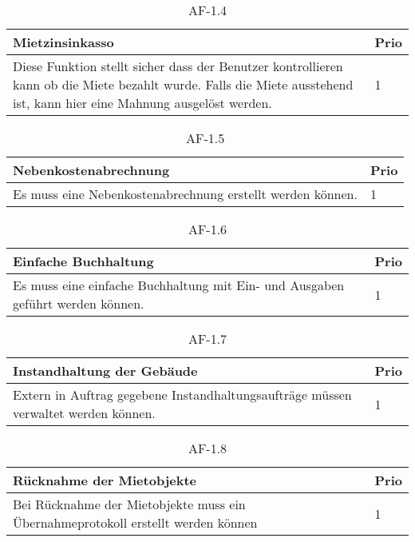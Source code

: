 \begin{table}[H]
  \centering
  \settowidth{}
  \setlength\extrarowheight{2pt}
  \begin{tabulary}{1.0\textwidth}{|m{16cm}|L|}
    \hline
    \textbf{Mietzinsinkasso}&\textbf{Prio}\\
    \hline
      Diese Funktion stellt sicher dass der Benutzer kontrollieren kann ob die Miete bezahlt wurde. Falls die Miete ausstehend ist, kann hier eine Mahnung ausgelöst werden. & 1\\
    \hline
  \end{tabulary}
  \caption{AF-1.4}
  \label{af14}
\end{table}

\begin{table}[H]
  \centering
  \settowidth{}
  \setlength\extrarowheight{2pt}
  \begin{tabulary}{1.0\textwidth}{|m{16cm}|L|}
    \hline
    \textbf{Nebenkostenabrechnung}&\textbf{Prio}\\
    \hline
      Es muss eine Nebenkostenabrechnung erstellt werden können. & 1\\
    \hline
  \end{tabulary}
  \caption{AF-1.5}
  \label{af15}
\end{table}

\begin{table}[H]
  \centering
  \settowidth{}
  \setlength\extrarowheight{2pt}
  \begin{tabulary}{1.0\textwidth}{|m{16cm}|L|}
    \hline
    \textbf{Einfache Buchhaltung}&\textbf{Prio}\\
    \hline
      Es muss eine einfache Buchhaltung mit Ein- und Ausgaben geführt werden können. & 1\\
    \hline
  \end{tabulary}
  \caption{AF-1.6}
  \label{af16}
\end{table}

\begin{table}[H]
  \centering
  \settowidth{}
  \setlength\extrarowheight{2pt}
  \begin{tabulary}{1.0\textwidth}{|m{16cm}|L|}
    \hline
    \textbf{Instandhaltung der Gebäude}&\textbf{Prio}\\
    \hline
      Extern in Auftrag gegebene Instandhaltungsaufträge müssen verwaltet werden können. & 1\\
    \hline
  \end{tabulary}
  \caption{AF-1.7}
  \label{af17}
\end{table}

\begin{table}[h]
  \centering
  \settowidth{}
  \setlength\extrarowheight{2pt}
  \begin{tabulary}{1.0\textwidth}{|m{16cm}|L|}
    \hline
    \textbf{Rücknahme der Mietobjekte}&\textbf{Prio}\\
    \hline
      Bei Rücknahme der Mietobjekte muss ein Übernahmeprotokoll erstellt werden können & 1\\
    \hline
  \end{tabulary}
  \caption{AF-1.8}
  \label{af18}
\end{table}
